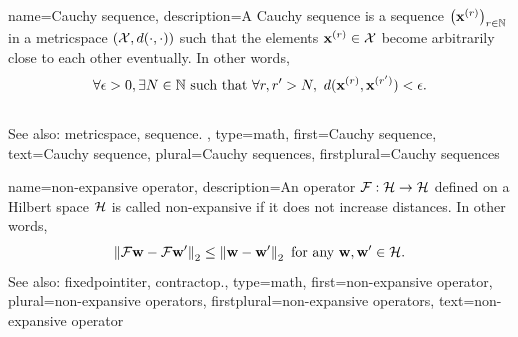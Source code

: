 {name={Cauchy sequence},
 description={A  Cauchy \gls{sequence} is a \gls{sequence}
          $\big( {\bf x}^{(r)}\big)_{r \in \mathbb{N}}$ 
		  in a \gls{metricspace} $\left( \mathcal{X},d(\cdot,\cdot) \right)$ such 
		  that the elements ${\bf x}^{(r)}\in \mathcal{X}$ 
		  become arbitrarily close to each other eventually. 
		  In other words, 
		  \[
		  \forall \epsilon > 0, \exists N \in \mathbb{N} \text{ such that } 
		  \forall \sampleidx, \sampleidx' > N, \ \metric{\featurevec^{(\sampleidx)}}{\featurevec^{(\sampleidx')}} < \epsilon.
		  \] \\ 
		  See also: \gls{metricspace}, \gls{sequence}. }, 
		type=math,
		first={Cauchy sequence},
		text={Cauchy sequence},
		plural={Cauchy sequences},
		firstplural={Cauchy sequences}
}

 {name={non-expansive operator},
 	description={An  operator 
	$\mathcal{F}: \mathcal{H} \rightarrow \mathcal{H}$ defined on a 
	Hilbert space $\mathcal{H}$ is called non-expansive if it does 
	not increase distances. 
	In other words,  
 		\begin{equation} 
 			\nonumber
 			\left\Vert { \mathcal{F}{\bf w}- \mathcal{F}{\bf w}'} \right\Vert_{2} 
			\leq 	\left\Vert {{\bf w}- {\bf w}'} \right\Vert_{2} \mbox{ for any } {\bf w}, {\bf w}' \in \mathcal{H}. 
 		\end{equation} 
 		See also: \gls{fixedpointiter}, \gls{contractop}.},
 	type=math, 
	first={non-expansive operator},
 	plural={non-expansive operators},
	firstplural={non-expansive operators},
 	text={non-expansive operator}
 }

